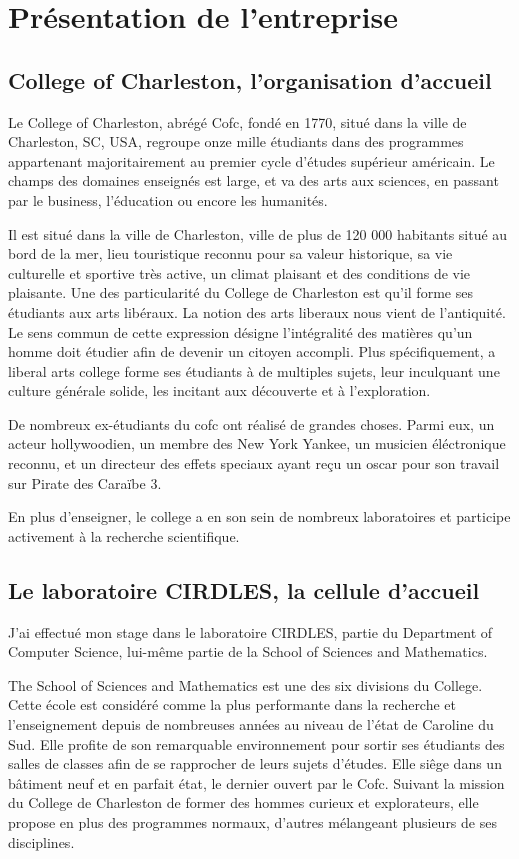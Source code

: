 \chapter{Présentation de l'entreprise}
\section{College of Charleston, l'organisation d'accueil}

Le College of Charleston, abrégé Cofc, fondé en 1770, situé dans la ville de Charleston, SC, USA, regroupe onze mille étudiants dans des programmes appartenant majoritairement au premier cycle d’études supérieur américain. Le champs des domaines enseignés est large, et va des arts aux sciences, en passant par le business, l'éducation ou encore les humanités.
 
Il est situé dans la ville de Charleston, ville de plus de 120 000 habitants situé au bord de la mer, lieu touristique reconnu pour sa valeur historique, sa vie culturelle et sportive très active, un climat plaisant et des conditions de vie plaisante.
Une des particularité du College de Charleston est qu’il forme ses étudiants aux arts libéraux.  La notion des arts liberaux nous vient de l’antiquité. Le sens commun de cette expression désigne l'intégralité des matières qu’un homme doit étudier afin de devenir un citoyen accompli. Plus spécifiquement, a liberal arts college forme ses étudiants à de multiples sujets, leur inculquant une culture générale solide, les incitant aux découverte et à l’exploration.

De nombreux ex-étudiants du cofc ont réalisé de grandes choses. Parmi eux, un acteur hollywoodien, un membre des New York Yankee, un musicien éléctronique reconnu, et un directeur des effets speciaux ayant reçu un oscar pour son travail sur Pirate des Caraïbe 3.

En plus d’enseigner, le college a en son sein de nombreux laboratoires et participe activement à la recherche scientifique.

\section{Le laboratoire CIRDLES, la cellule d’accueil}
J’ai effectué mon stage dans le laboratoire CIRDLES, partie du Department of Computer Science, lui-même partie de la School of Sciences and Mathematics.

The School of Sciences and Mathematics est une des six divisions du College. Cette école est considéré comme la plus performante dans la recherche et l’enseignement depuis de nombreuses années au niveau de l’état de Caroline du Sud. Elle profite de son remarquable environnement pour sortir ses étudiants des salles de classes afin de se rapprocher de leurs sujets d’études. Elle siêge dans un bâtiment neuf et en parfait état, le dernier ouvert par le Cofc. Suivant la mission du College de Charleston de former des hommes curieux et explorateurs, elle propose en plus des programmes normaux, d’autres mélangeant plusieurs de ses disciplines.

